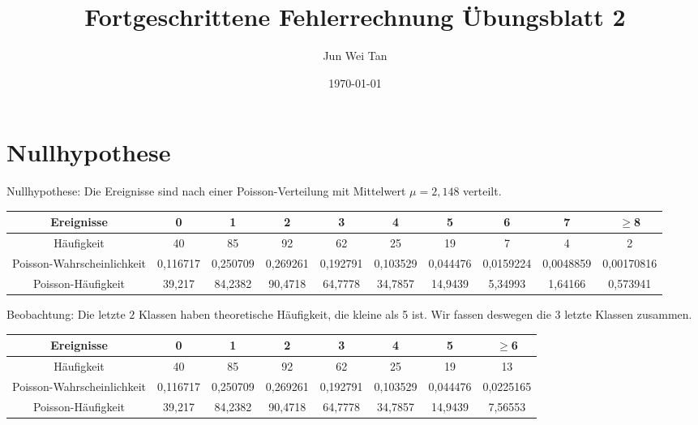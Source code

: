 \documentclass[prb,12pt]{revtex4-2}
\theoremstyle{definition}
\theoremstyle{definition}
\begin{document}
\title{Fortgeschrittene Fehlerrechnung Übungsblatt 2}
	\author{Jun Wei Tan}
	\date{\today}
	\maketitle


\section{Nullhypothese}
Nullhypothese: Die Ereignisse sind nach einer Poisson-Verteilung mit Mittelwert $\mu=2,148$ verteilt.
\begin{table}[h]
	{\scriptsize
\begin{tabular}{cccccccccc}
	\toprule
\textbf{Ereignisse} & 0 & 1 & 2 & 3 & 4 & 5 & 6 & 7 & $\ge$8 \\\midrule
H\"{a}ufigkeit & 40 & 85 & 92 & 62 & 25 & 19 & 7 & 4 & 2 \\\midrule
Poisson-Wahrscheinlichkeit & 0,116717 & 0,250709 & 0,269261 & 0,192791 & 0,103529 & 0,044476 & 0,0159224 & 0,0048859 & 0,00170816 \\\midrule
Poisson-Häufigkeit  & 39,217 & 84,2382 & 90,4718 & 64,7778 & 34,7857 & 14,9439 & 5,34993 & 1,64166 & 0,573941 \\\bottomrule
\end{tabular}
}
\end{table}

Beobachtung: Die letzte $2$ Klassen haben theoretische Häufigkeit, die kleine als 5 ist. Wir fassen deswegen die 3 letzte Klassen zusammen.
\begin{table}[h]
	{\footnotesize
		\setlength{\tabcolsep}{4.5pt}
		\begin{tabular}{cccccccc}
			\toprule
\textbf{Ereignisse} &	0 & 1 & 2 & 3 & 4 & 5 & $\ge$6 \\\midrule
H\"{a}ufigkeit &	40 & 85 & 92 & 62 & 25 & 19 & 13 \\\midrule
Poisson-Wahrscheinlichkeit &	0,116717 & 0,250709 & 0,269261 & 0,192791 & 0,103529 & 0,044476 & 0,0225165 \\\midrule
Poisson-Häufigkeit  & 	39,217 & 84,2382 & 90,4718 & 64,7778 & 34,7857 & 14,9439 & 7,56553 \\\bottomrule
		\end{tabular}
	}
\end{table}
\end{document}
